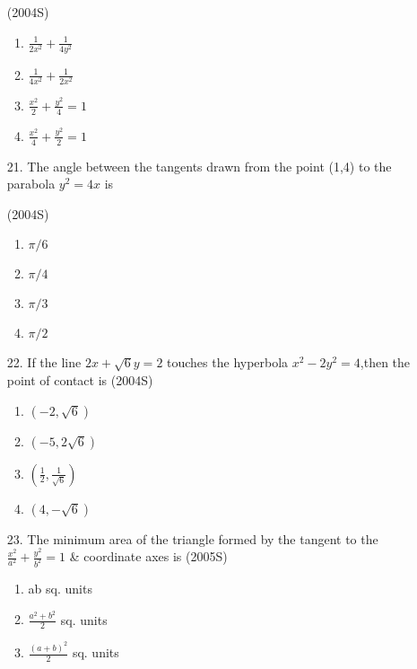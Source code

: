 \documentclass[journal,12pt,twocolumn]{IEEEtran}
\theoremstyle{remark}
\begin{document}
\begin{enumerate}
\hfill{(2004S)}
\begin{enumerate}
    \item $\frac{1}{2x^{2}}+\frac{1}{4y^{2}}$ \\
    \item $\frac{1}{4x^{2}}+\frac{1}{2x^{2}}$ \\
    \item $\frac{x^{2}}{2}+\frac{y^{2}}{4}=1$ \\
    \item $\frac{x^{2}}{4}+\frac{y^{2}}{2}=1$ \\
\end{enumerate}
\item[21.] The angle between the tangents drawn from the point (1,4) to the parabola $y^{2}=4x$ is 

\hfill{(2004S)}
\begin{enumerate}
    \item $\pi/6$ \\
    \item $\pi/4$ \\
    \item $\pi/3$ \\
    \item $\pi/2$ \\
\end{enumerate}
\item[22.] If the line $2x+\sqrt{6}y=2$ touches the hyperbola $x^{2}-2y^{2}=4$,then the point of contact is \hfill{(2004S)}
\begin{enumerate}
    \item $(-2,\sqrt{6})$\\
    \item $(-5,2\sqrt{6})$\\
    \item $(\frac{1}{2},\frac{1}{\sqrt{6}})$\\
    \item $(4,-\sqrt{6})$\\
\end{enumerate}
\item[23.] The minimum area of the triangle formed by the tangent to the $\frac{x^{2}}{a^{2}}+\frac{y^{2}}{b^{2}}=1$ \& coordinate axes is \hfill{(2005S)}
\begin{enumerate}
    \item ab sq. units\\
    \item $\frac{a^{2}+b^{2}}{2}$ sq. units\\
    \item $\frac{(a+b)^{2}}{2}$ sq. units\\

\end{enumerate}
\end{enumerate}
\end{document}
